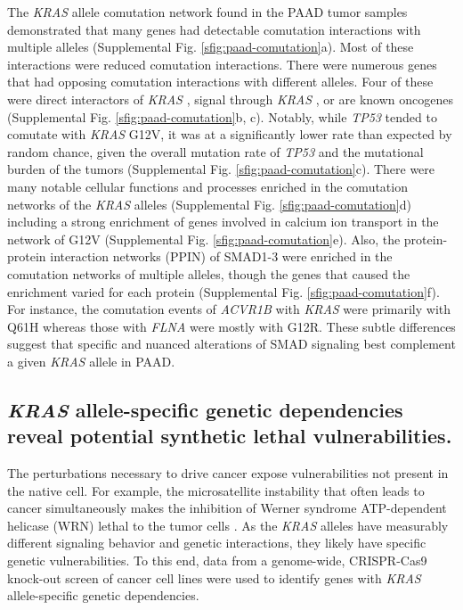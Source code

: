 \documentclass[english, 10pt, letterpaper]{article}
\newcommand{\KRAS}{\emph{KRAS}}
\begin{document}
The \KRAS{} allele comutation network found in the PAAD tumor samples demonstrated that many genes had detectable comutation interactions with multiple alleles (Supplemental Fig. \ref{sfig:paad-comutation}a).
Most of these interactions were reduced comutation interactions.
There were numerous genes that had opposing comutation interactions with different alleles.
Four of these were direct interactors of \KRAS{} \cite{Kovalski2019}, signal through \KRAS{} \cite{Kanehisa2017, Kanehisa2016KEGGAnnotation.}, or are known oncogenes \cite{Bamford2004TheWebsite., Sondka2018} (Supplemental Fig. \ref{sfig:paad-comutation}b, c).
Notably, while \emph{TP53} tended to comutate with \KRAS{} G12V, it was at a significantly lower rate than expected by random chance, given the overall mutation rate of \emph{TP53} and the mutational burden of the tumors (Supplemental Fig. \ref{sfig:paad-comutation}c).
There were many notable cellular functions and processes enriched in the comutation networks of the \KRAS{} alleles (Supplemental Fig. \ref{sfig:paad-comutation}d) including a strong enrichment of genes involved in calcium ion transport in the network of G12V (Supplemental Fig. \ref{sfig:paad-comutation}e).
Also, the protein-protein interaction networks (PPIN) of SMAD1-3 were enriched in the comutation networks of multiple alleles, though the genes that caused the enrichment varied for each protein (Supplemental Fig. \ref{sfig:paad-comutation}f).
For instance, the comutation events of \emph{ACVR1B} with \KRAS{} were primarily with Q61H whereas those with \emph{FLNA} were mostly with G12R.
These subtle differences suggest that specific and nuanced alterations of SMAD signaling best complement a given \KRAS{} allele in PAAD.


\subsection*{\KRAS{} allele-specific genetic dependencies reveal potential synthetic lethal vulnerabilities.}

The perturbations necessary to drive cancer expose vulnerabilities not present in the native cell.
For example, the microsatellite instability that often leads to cancer simultaneously makes the inhibition of Werner syndrome ATP-dependent helicase (WRN) lethal to the tumor cells \cite{Behan2019, Chan2019}.
As the \KRAS{} alleles have measurably different signaling behavior and genetic interactions, they likely have specific genetic vulnerabilities.
To this end, data from a genome-wide, CRISPR-Cas9 knock-out screen of cancer cell lines \cite{Tsherniak2017, Meyers2017} were used to identify genes with \KRAS{} allele-specific genetic dependencies.
\end{document}
